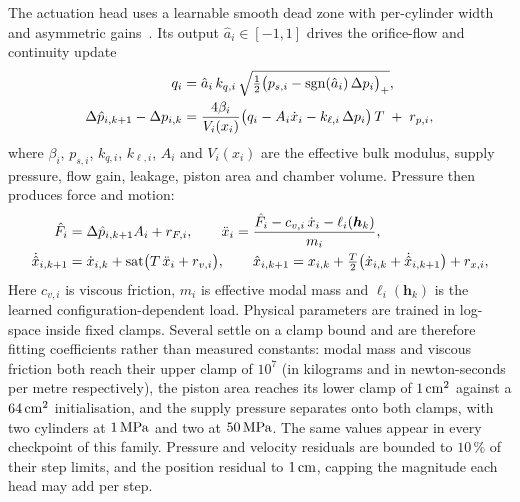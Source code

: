 The actuation head uses a learnable smooth dead zone with per-cylinder width
and asymmetric gains~\cite{yang2026stateconstrained}. Its output
$\hat{a}_i\in[-1,1]$ drives the orifice-flow and continuity update
%
\begin{align}
  q_i &= \hat{a}_i\, k_{q,i}\,
    \sqrt{\tfrac{1}{2}\bigl(p_{s,i} - \operatorname{sgn}(\hat{a}_i)\,
    \Delta p_i\bigr)_{+}}, \notag \\
  \Delta \hat{p}_{i,k+1} - \Delta p_{i,k} &=
    \frac{4\beta_i}{V_i(x_i)}
    \bigl(q_i - A_i \dot{x}_i - k_{\ell,i}\, \Delta p_i\bigr)\, T
    \;+\; r_{p,i},
  \label{eq:models:rom-pressure}
\end{align}
%
where $\beta_i$, $p_{s,i}$, $k_{q,i}$, $k_{\ell,i}$, $A_i$ and $V_i(x_i)$ are
the effective bulk modulus, supply pressure, flow gain, leakage, piston area
and chamber volume. Pressure then produces force and motion:
%
\begin{align}
  \hat{F}_i &= \Delta\hat{p}_{i,k+1} A_i + r_{F,i}, \qquad
  \ddot{x}_i = \frac{\hat{F}_i - c_{v,i}\,\dot{x}_i - \ell_i(\bm{h}_k)}{m_i},
  \notag \\
  \dot{\hat{x}}_{i,k+1} &= \dot{x}_{i,k}
    + \operatorname{sat}\bigl(T\,\ddot{x}_i + r_{v,i}\bigr), \qquad
  \hat{x}_{i,k+1} = x_{i,k}
    + \tfrac{T}{2}\bigl(\dot{x}_{i,k} + \dot{\hat{x}}_{i,k+1}\bigr)
    + r_{x,i},
  \label{eq:models:rom-motion}
\end{align}
%
Here $c_{v,i}$ is viscous friction, $m_i$ is effective modal mass and
$\ell_i(\bm{h}_k)$ is the learned configuration-dependent load. Physical
parameters are trained in log-space inside fixed clamps. Several settle on a
clamp bound and are therefore fitting coefficients rather than measured
constants: modal mass and viscous friction both reach their upper clamp of
$10^{7}$ (in kilograms and in newton-seconds per metre respectively), the
piston area reaches its lower clamp of $\unit[1]{cm^2}$ against a
$\unit[64]{cm^2}$ initialisation, and the supply pressure separates onto both
clamps, with two cylinders at $\unit[1]{MPa}$ and two at $\unit[50]{MPa}$. The
same values appear in every checkpoint of this family. Pressure and velocity
residuals are bounded to $10\,\%$ of their step limits, and the position
residual to $\unit[1]{cm}$, capping the magnitude each head may add per step.


